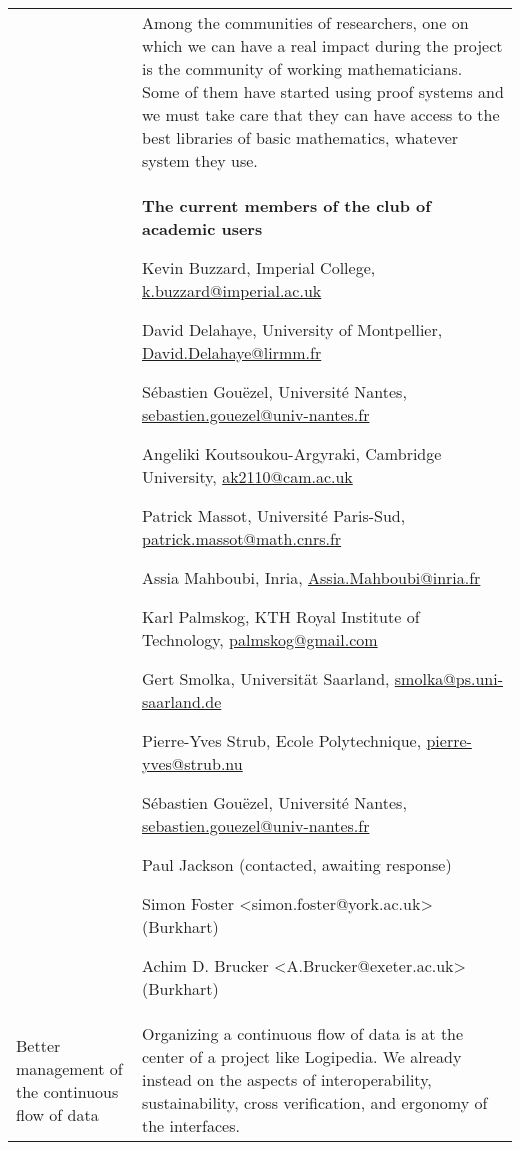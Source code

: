 \begin{longtable}{|p{}|p{}|}
&
\hspace{0.4cm}
Among the communities of researchers, one on which we can have a real
impact during the project is the community of working mathematicians.
Some of them have started using proof systems and we must take care that they
can have access to the best libraries of basic mathematics, whatever system
they use.\\
&
\begin{framed}
\begin{center}
  {\bf \Large The current members of the club of academic users}
\end{center}

\begin{compactitem}
\item Kevin Buzzard, Imperial College, \url{k.buzzard@imperial.ac.uk}
\item David Delahaye, University of Montpellier, \url{David.Delahaye@lirmm.fr}
\item Sébastien Gouëzel, Université Nantes, \url{sebastien.gouezel@univ-nantes.fr}
\item Angeliki Koutsoukou-Argyraki, Cambridge University, \url{ak2110@cam.ac.uk }
\item Patrick Massot, Université Paris-Sud, \url{patrick.massot@math.cnrs.fr}
\item Assia Mahboubi, Inria, \url{Assia.Mahboubi@inria.fr}
\item Karl Palmskog,  KTH Royal Institute of Technology, \url{palmskog@gmail.com}
\item Gert Smolka, Universität Saarland, \url{smolka@ps.uni-saarland.de}
\item Pierre-Yves Strub, Ecole Polytechnique, \url{pierre-yves@strub.nu}

\item Sébastien Gouëzel, Université Nantes, \url{sebastien.gouezel@univ-nantes.fr}

\item Paul Jackson (contacted, awaiting response)
\item Simon Foster <simon.foster@york.ac.uk> (Burkhart)
\item Achim D. Brucker <A.Brucker@exeter.ac.uk> (Burkhart)

\end{compactitem}

\end{framed}\\
\hline
Better management of the continuous flow of data&
Organizing a continuous flow of data is at the center of a project
like Logipedia. We already instead on the aspects of interoperability,
sustainability, cross verification, and ergonomy of the interfaces.\\


\end{longtable}
